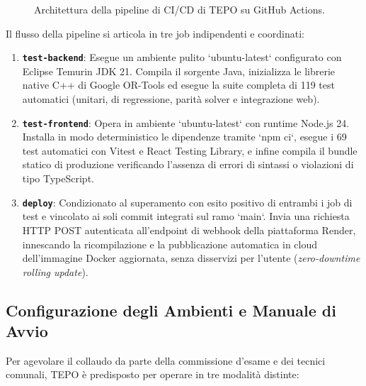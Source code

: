 \begin{figure}[H]
    \caption{Architettura della pipeline di CI/CD di TEPO su GitHub Actions.}
    \label{fig:pipeline_ci}
\end{figure}

Il flusso della pipeline si articola in tre job indipendenti e coordinati:
\begin{enumerate}[leftmargin=1.5em, itemsep=0.3em]
    \item \textbf{\texttt{test-backend}}: Esegue un ambiente pulito `ubuntu-latest` configurato con Eclipse Temurin JDK 21. Compila il sorgente Java, inizializza le librerie native C++ di Google OR-Tools ed esegue la suite completa di 119 test automatici (unitari, di regressione, parità solver e integrazione web).
    \item \textbf{\texttt{test-frontend}}: Opera in ambiente `ubuntu-latest` con runtime Node.js 24. Installa in modo deterministico le dipendenze tramite `npm ci`, esegue i 69 test automatici con Vitest e React Testing Library, e infine compila il bundle statico di produzione verificando l'assenza di errori di sintassi o violazioni di tipo TypeScript.
    \item \textbf{\texttt{deploy}}: Condizionato al superamento con esito positivo di entrambi i job di test e vincolato ai soli commit integrati sul ramo `main`. Invia una richiesta HTTP POST autenticata all'endpoint di webhook della piattaforma Render, innescando la ricompilazione e la pubblicazione automatica in cloud dell'immagine Docker aggiornata, senza disservizi per l'utente (\emph{zero-downtime rolling update}).
\end{enumerate}

\subsection{Configurazione degli Ambienti e Manuale di Avvio}
Per agevolare il collaudo da parte della commissione d'esame e dei tecnici comunali, TEPO è predisposto per operare in tre modalità distinte:

